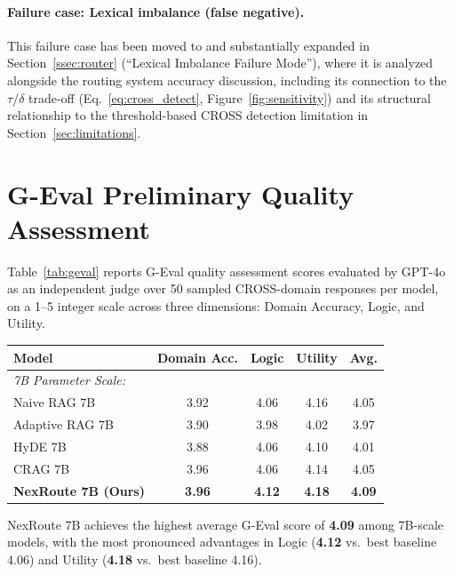 \documentclass[a4paper,fleql]{cas-sc}
\begin{document}
\paragraph{Failure case: Lexical imbalance (false negative).}
This failure case has been moved to and substantially expanded in
Section~\ref{ssec:router} (``Lexical Imbalance Failure Mode''), where it is
analyzed alongside the routing system accuracy discussion, including its
connection to the $\tau$/$\delta$ trade-off (Eq.~\ref{eq:cross_detect},
Figure~\ref{fig:sensitivity}) and its structural relationship to the
threshold-based CROSS detection limitation in Section~\ref{sec:limitations}.

\section{G-Eval Preliminary Quality Assessment}
\label{appendix:geval}

Table~\ref{tab:geval} reports G-Eval quality assessment scores evaluated by
GPT-4o as an independent judge over 50 sampled CROSS-domain responses per
model, on a 1--5 integer scale across three dimensions: Domain Accuracy,
Logic, and Utility.

\vspace{6pt plus 4pt minus 3pt}
\begin{center}
\begingroup
{}
\label{tab:geval}
\begin{tabular}{lcccc}
\toprule
\textbf{Model} & \textbf{Domain Acc.} & \textbf{Logic} & \textbf{Utility} & \textbf{Avg.} \\
\midrule
\multicolumn{5}{l}{\textit{7B Parameter Scale:}} \\
Naive RAG 7B                & 3.92 & 4.06 & 4.16 & 4.05 \\
Adaptive RAG 7B             & 3.90 & 3.98 & 4.02 & 3.97 \\
HyDE 7B                     & 3.88 & 4.06 & 4.10 & 4.01 \\
CRAG 7B                     & 3.96 & 4.06 & 4.14 & 4.05 \\
\textbf{NexRoute 7B (Ours)} & \textbf{3.96} & \textbf{4.12} & \textbf{4.18} & \textbf{4.09} \\
\bottomrule
\end{tabular}
\endgroup
\end{center}
\vspace{6pt plus 4pt minus 3pt}

NexRoute 7B achieves the highest average G-Eval score of \textbf{4.09} among
7B-scale models, with the most pronounced advantages in Logic (\textbf{4.12}
vs.\ best baseline 4.06) and Utility (\textbf{4.18} vs.\ best baseline 4.16).
\end{document}
